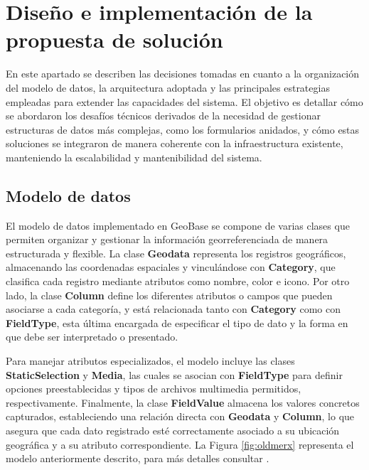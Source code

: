\documentclass{article}
\begin{document}
\section{Diseño e implementación de la propuesta de solución}

En este apartado se describen las decisiones tomadas en cuanto a la organización del modelo de datos, la arquitectura adoptada y las principales estrategias empleadas para extender las capacidades del sistema. El objetivo es detallar cómo se abordaron los desafíos técnicos derivados de la necesidad de gestionar estructuras de datos más complejas, como los formularios anidados, y cómo estas soluciones se integraron de manera coherente con la infraestructura existente, manteniendo la escalabilidad y mantenibilidad del sistema.

\subsection{Modelo de datos}

El modelo de datos implementado en GeoBase se compone de varias clases que permiten organizar y gestionar la información georreferenciada de manera estructurada y flexible. La clase \textbf{Geodata} representa los registros geográficos, almacenando las coordenadas espaciales y vinculándose con \textbf{Category}, que clasifica cada registro mediante atributos como nombre, color e icono. Por otro lado, la clase \textbf{Column} define los diferentes atributos o campos que pueden asociarse a cada categoría, y está relacionada tanto con \textbf{Category} como con \textbf{FieldType}, esta última encargada de especificar el tipo de dato y la forma en que debe ser interpretado o presentado.

Para manejar atributos especializados, el modelo incluye las clases \textbf{StaticSelection} y \textbf{Media}, las cuales se asocian con \textbf{FieldType} para definir opciones preestablecidas y tipos de archivos multimedia permitidos, respectivamente. Finalmente, la clase \textbf{FieldValue} almacena los valores concretos capturados, estableciendo una relación directa con \textbf{Geodata} y \textbf{Column}, lo que asegura que cada dato registrado esté correctamente asociado a su ubicación geográfica y a su atributo correspondiente. La Figura \ref{fig:oldmerx} representa el modelo anteriormente descrito, para más detalles consultar \cite{garcia2024}.
\end{document}
